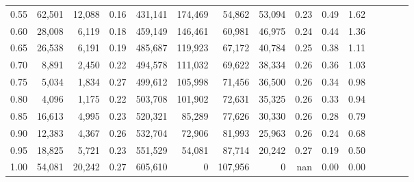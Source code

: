 \begin{tabular}{rrrcrrrrrrrrrrr}
0.55 &  62,501 &  12,088 &                                       0.16 &  431,141 &  174,469 &   54,862 &   53,094 &  0.23 &  0.49 &                         1.62 \\
0.60 &  28,008 &   6,119 &                                       0.18 &  459,149 &  146,461 &   60,981 &   46,975 &  0.24 &  0.44 &                         1.36 \\
0.65 &  26,538 &   6,191 &                                       0.19 &  485,687 &  119,923 &   67,172 &   40,784 &  0.25 &  0.38 &                         1.11 \\
0.70 &   8,891 &   2,450 &                                       0.22 &  494,578 &  111,032 &   69,622 &   38,334 &  0.26 &  0.36 &                         1.03 \\
0.75 &   5,034 &   1,834 &                                       0.27 &  499,612 &  105,998 &   71,456 &   36,500 &  0.26 &  0.34 &                         0.98 \\
0.80 &   4,096 &   1,175 &                                       0.22 &  503,708 &  101,902 &   72,631 &   35,325 &  0.26 &  0.33 &                         0.94 \\
0.85 &  16,613 &   4,995 &                                       0.23 &  520,321 &   85,289 &   77,626 &   30,330 &  0.26 &  0.28 &                         0.79 \\
0.90 &  12,383 &   4,367 &                                       0.26 &  532,704 &   72,906 &   81,993 &   25,963 &  0.26 &  0.24 &                         0.68 \\
0.95 &  18,825 &   5,721 &                                       0.23 &  551,529 &   54,081 &   87,714 &   20,242 &  0.27 &  0.19 &                         0.50 \\
1.00 &  54,081 &  20,242 &                                       0.27 &  605,610 &        0 &  107,956 &        0 &   nan &  0.00 &                         0.00 \\
\bottomrule
\end{tabular}
